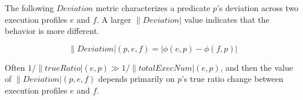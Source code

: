 The following $Deviation$ metric
characterizes a predicate $p$'s deviation across two execution
profiles $e$ and $f$. A larger $\|Deviation|$ value indicates that the
behavior is more different. %

\vspace{-2mm}

{\small{
\[
\|Deviation|(p, e, f) = |\phi(e, p) - \phi(f, p)|
\]
}}
\vspace{-4mm}

Often $1/\|trueRatio|(e, p) \gg 1/\|totalExecNum|(e, p)$, and
then the value of $\|Deviation|(p, e, f)$ depends primarily on $p$'s
true ratio change between execution profiles $e$ and $f$. 





